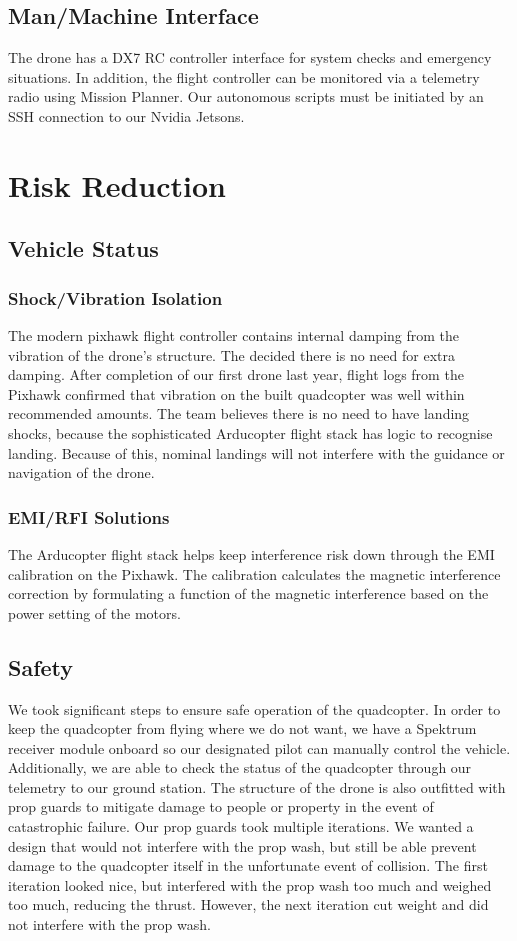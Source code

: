 \documentclass[12pt,letterpaper]{article}
\begin{document}
	\subsection*{Man/Machine Interface}
		The drone has a DX7 RC controller interface for system checks and emergency situations. In addition, the flight controller can be monitored via a telemetry radio using Mission Planner. Our autonomous scripts must be initiated by an SSH connection to our Nvidia Jetsons.

\section*{Risk Reduction}
	\subsection*{Vehicle Status}
		\subsubsection*{Shock/Vibration Isolation}
		The modern pixhawk flight controller contains internal damping from the vibration of the drone’s structure. The decided there is no need for extra damping. After completion of our first drone last year, flight logs from the Pixhawk confirmed that vibration on the built quadcopter was well within recommended amounts. The team believes there is no need to have landing shocks, because the sophisticated Arducopter flight stack has logic to recognise landing. Because of this, nominal landings will not interfere with the guidance or navigation of the drone. 

		\subsubsection*{EMI/RFI Solutions}
		The Arducopter flight stack helps keep interference risk down through the EMI calibration on the Pixhawk. The calibration calculates the magnetic interference correction by formulating a function of the magnetic interference based on the power setting of the motors.


	\subsection*{Safety}
		We took significant steps to ensure safe operation of the quadcopter. In order to keep the quadcopter from flying where we do not want, we have a Spektrum receiver module onboard so our designated pilot can manually control the vehicle. Additionally, we are able to check the status of the quadcopter through our telemetry to our ground station. The structure of the drone is also outfitted with prop guards to mitigate damage to people or property in the event of catastrophic failure. Our prop guards took multiple iterations. We wanted a design that would not interfere with the prop wash, but still be able prevent damage to the quadcopter itself in the unfortunate event of collision. The first iteration looked nice, but interfered with the prop wash too much and weighed too much, reducing the thrust. However, the next iteration cut weight and did not interfere with the prop wash.
\end{document}

